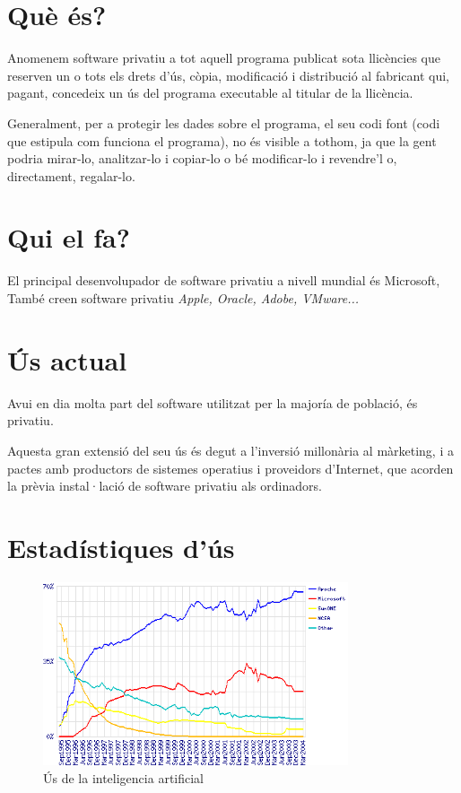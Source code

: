 \section{Què és?}

Anomenem software privatiu a tot aquell programa publicat sota llicències
que reserven un o tots els drets d'ús, còpia, modificació i distribució
al fabricant qui, pagant, concedeix un ús del programa executable al titular
de la llicència.

Generalment, per a protegir les dades sobre el programa, el seu codi font
(codi que estipula com funciona el programa), no és visible a tothom, ja 
que la gent podria mirar-lo, analitzar-lo i copiar-lo o bé modificar-lo i
revendre'l o, directament, regalar-lo. \cite{gnucategories}

\section{Qui el fa?}

El principal desenvolupador de software privatiu a nivell mundial és Microsoft,
També creen software privatiu \emph{Apple, Oracle, Adobe,
VMware...}

\section{Ús actual}

Avui en dia molta part del software utilitzat per la majoría de població, és privatiu.

Aquesta gran extensió del seu ús és degut a l'inversió millonària al màrketing, i a
pactes amb productors de sistemes operatius i proveidors d'Internet, que acorden la
prèvia instal·lació de software privatiu als ordinadors.

\section{Estadístiques d'ús}

\begin{figure}[ht!]
\centering
\includegraphics[width=90mm]{data/img.png}
\caption{Ús de la inteligencia artificial}
\label{overflow}
\end{figure}

